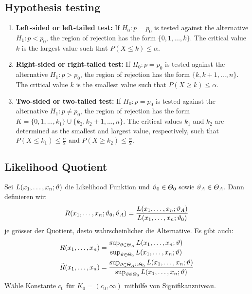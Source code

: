 \subsection{Hypothesis testing}
\begin{enumerate}
  \item \textbf{Left-sided or left-tailed test: } If $H_0 : p = p_0$ is tested against the alternative $H_1 : p < p_0$, the region of rejection has the form $\{0, 1, \ldots, k\}$. The critical value $k$ is the largest value such that $P(X \leq k) \leq \alpha$.
  \item \textbf{Right-sided or right-tailed test: } If \(H_0 : p = p_0\) is tested against the alternative \(H_1 : p > p_0\), the region of rejection has the form \(\{k, k + 1, \ldots , n\}\). The critical value \(k\) is the smallest value such that \(P(X \geq k) \leq \alpha\).
  \item \textbf{Two-sided or two-tailed test: } If \(H_0 : p = p_0\) is tested against the alternative \(H_1 : p \neq p_0\), the region of rejection has the form \(K = \{0, 1, \ldots , k_1\} \cup \{k_2, k_2+1, \ldots , n\}\). The critical values \(k_1\) and \(k_2\) are determined as the smallest and largest value, respectively, such that \(P(X \leq k_1) \leq \frac{\alpha}{2}\) and \(P(X \geq k_2) \leq \frac{\alpha}{2}\).

\end{enumerate}

\subsection{Likelihood Quotient}
Sei $L (x_1, \dots, x_n; \vartheta)$ die Likelihood Funktion und $\vartheta_0 \in
  \varTheta_0$ sowie $\vartheta_A \in \varTheta_A$. Dann definieren wir:
\begin{align*}
  R (x_1, \dots, x_n; \vartheta_0, \vartheta_A) = \frac{L (x_1, \dots, x_n; \vartheta_A)}{L (x_1, \dots, x_n; \vartheta_0)}
\end{align*}
je grösser der Quotient, desto wahrscheinlicher die Alternative. Es gibt auch:
\begin{align*}
  R (x_1, \dots, x_n)             & = \frac{ \sup_{\vartheta \in \varTheta_A} L (x_1, \dots, x_n; \vartheta)}{\sup_{\vartheta \in \varTheta_0} L (x_1, \dots, x_n; \vartheta)}                  \\
  \widetilde{R} (x_1, \dots, x_n) & = \frac{ \sup_{\vartheta \in \varTheta_A \cup \varTheta_0} L (x_1, \dots, x_n; \vartheta)}{\sup_{\vartheta \in \varTheta_0} L (x_1, \dots, x_n; \vartheta)} \\
\end{align*}
Wähle Konstante $c_0$ für $K_0 =  (c_0, \infty)$ mithilfe von Signifikanzniveau.
